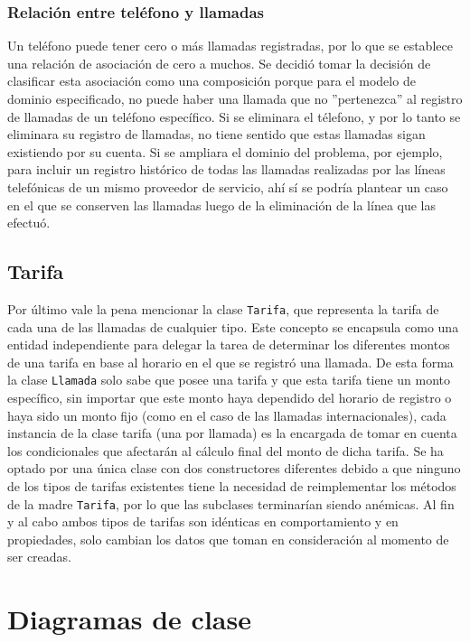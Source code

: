 \documentclass[titlepage,a4paper]{article}
\begin{document}
\subsubsection{Relación entre teléfono y llamadas}

Un teléfono puede tener cero o más llamadas registradas, por lo que se establece una relación de asociación de cero a muchos. Se decidió tomar la decisión de clasificar esta asociación como una composición porque para el modelo de dominio especificado, no puede haber una llamada que no ''pertenezca'' al registro de llamadas de un teléfono específico. Si se eliminara el télefono, y por lo tanto se eliminara su registro de llamadas, no tiene sentido que estas llamadas sigan existiendo por su cuenta. Si se ampliara el dominio del problema, por ejemplo, para incluir un registro histórico de todas las llamadas realizadas por las líneas telefónicas de un mismo proveedor de servicio, ahí sí se podría plantear un caso en el que se conserven las llamadas luego de la eliminación de la línea que las efectuó.

\subsection{Tarifa}

Por último vale la pena mencionar la clase \lstinline{Tarifa}, que representa la tarifa de cada una de las llamadas de cualquier tipo. Este concepto se encapsula como una entidad independiente para delegar la tarea de determinar los diferentes montos de una tarifa en base al horario en el que se registró una llamada. De esta forma la clase \lstinline{Llamada} solo sabe que posee una tarifa y que esta tarifa tiene un monto específico, sin importar que este monto haya dependido del horario de registro o haya sido un monto fijo (como en el caso de las llamadas internacionales), cada instancia de la clase tarifa (una por llamada) es la encargada de tomar en cuenta los condicionales que afectarán al cálculo final del monto de dicha tarifa. Se ha optado por una única clase con dos constructores diferentes debido a que ninguno de los tipos de tarifas existentes tiene la necesidad de reimplementar los métodos de la madre \lstinline{Tarifa}, por lo que las subclases terminarían siendo anémicas. Al fin y al cabo ambos tipos de tarifas son idénticas en comportamiento y en propiedades, solo cambian los datos que toman en consideración al momento de ser creadas.



\section{Diagramas de clase}\label{sec:diagramasdeclase}
\end{document}
